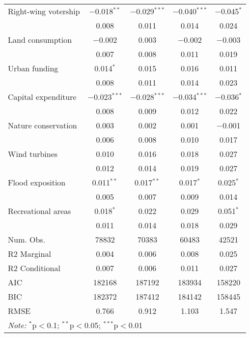 \begin{table}
\begin{tabular}[t]{lcccc}
Right-wing votership & \num{-0.018}$^{**}$ & \num{-0.029}$^{***}$ & \num{-0.040}$^{***}$ & \num{-0.045}$^{*}$\\
 & \num{0.008} & \num{0.011} & \num{0.014} & \num{0.024}\\
Land consumption & \num{-0.002} & \num{0.003} & \num{-0.002} & \num{-0.003}\\
 & \num{0.007} & \num{0.008} & \num{0.011} & \num{0.019}\\
Urban funding & \num{0.014}$^{*}$ & \num{0.015} & \num{0.016} & \num{0.011}\\
 & \num{0.008} & \num{0.011} & \num{0.014} & \num{0.023}\\
Capital expenditure & \num{-0.023}$^{***}$ & \num{-0.028}$^{***}$ & \num{-0.034}$^{***}$ & \num{-0.036}$^{*}$\\
 & \num{0.008} & \num{0.009} & \num{0.012} & \num{0.022}\\
Nature conservation & \num{0.003} & \num{0.002} & \num{0.001} & \num{-0.001}\\
 & \num{0.006} & \num{0.008} & \num{0.010} & \num{0.017}\\
Wind turbines & \num{0.010} & \num{0.016} & \num{0.018} & \num{0.027}\\
 & \num{0.012} & \num{0.014} & \num{0.019} & \num{0.027}\\
Flood exposition & \num{0.011}$^{**}$ & \num{0.017}$^{**}$ & \num{0.017}$^{*}$ & \num{0.025}$^{*}$\\
 & \num{0.005} & \num{0.007} & \num{0.009} & \num{0.014}\\
Recreational areas & \num{0.018}$^{*}$ & \num{0.022} & \num{0.029} & \num{0.051}$^{*}$\\
 & \num{0.011} & \num{0.014} & \num{0.018} & \num{0.029}\\
\midrule
Num. Obs. & \num{78832} & \num{70383} & \num{60483} & \num{42521}\\
R2 Marginal & \num{0.004} & \num{0.006} & \num{0.008} & \num{0.025}\\
R2 Conditional & \num{0.007} & \num{0.006} & \num{0.011} & \num{0.027}\\
AIC & \num{182168} & \num{187192} & \num{183934} & \num{158220}\\
BIC & \num{182372} & \num{187412} & \num{184142} & \num{158445}\\
RMSE & \num{0.766} & \num{0.912} & \num{1.103} & \num{1.547}\\
\bottomrule
\multicolumn{5}{l}{\rule{0pt}{1em}\textit{Note: } $^{*}$p$<$0.1; $^{**}$p$<$0.05; $^{***}$p$<$0.01}\\
\end{tabular}
\end{table}